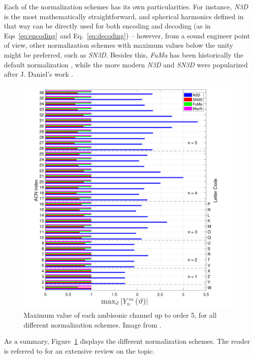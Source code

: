 Each of the normalization schemes has its own particularities. For instance, \textit{N3D} is the most mathematically straightforward, and spherical harmonics defined in that way can be directly used for both encoding and decoding (as in Eqs~\ref{eq:encoding} and Eq.~\ref{eq:decoding}) -- however, from a sound engineer point of view, other normalization schemes with maximum values below the unity might be preferred, such as \textit{SN3D}. Besides this, \textit{FuMa} has been historically the default normalization \cite{gerzon1985ambisonics}, while the more modern \textit{N3D} and \textit{SN3D} were popularized after J. Daniel's work \cite{daniel2000representation}. \\

\begin{figure}[ht!]
  \includegraphics[width=1.1\textwidth]{Figures/ScientificBackground/normalization.png}
  \caption{Maximum value of each ambisonic channel up to order 5, for all different normalization schemes. Image from \cite{carpentier2017ambisonic}.}
  \label{fig:normalization}
\end{figure}


As a summary, Figure~\ref{fig:normalization} displays the different normalization schemes. The reader is referred to \cite{carpentier2017ambisonic} for an extensive review on the topic.


